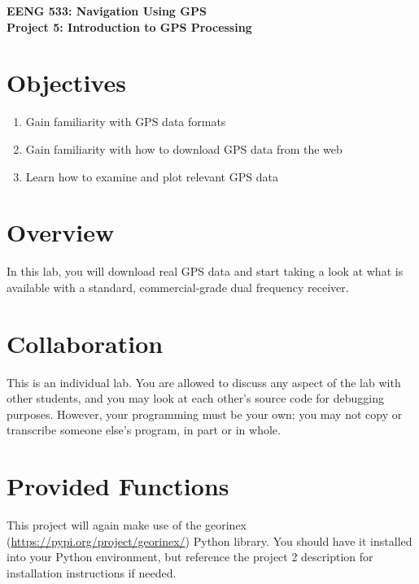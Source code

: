 \documentclass[12pt]{article}
\begin{document}
\begin{minipage}{0.9\textwidth}
   \raggedright
   \large \textbf{\textsf{{\color{gray}EENG 533: Navigation Using GPS} \\
      Project 5: Introduction to GPS Processing}}
\end{minipage}
\vspace{1cm}

\section*{\textsf{Objectives}}

\begin{enumerate}
   \item Gain familiarity with GPS data formats
   \item Gain familiarity with how to download GPS data from the web
   \item Learn how to examine and plot relevant GPS data
\end{enumerate}

\section*{\textsf{Overview}}

In this lab, you will download real GPS data and start taking a look at what is
available with a standard, commercial-grade dual frequency receiver.

\section*{\textsf{Collaboration}}

This is an individual lab.   You are allowed to discuss any aspect of the lab
with other students, and you may look at each other's source code for debugging
purposes.  However, your programming must be your own; you may not copy or
transcribe someone else's program, in part or in whole.

\section*{\textsf{Provided Functions}}

This project will again make use of the georinex (\url{https://pypi.org/project/georinex/})
 Python library.  You should have it installed into your Python environment, 
but reference the project 2 description for installation instructions if needed.  
\end{document}
